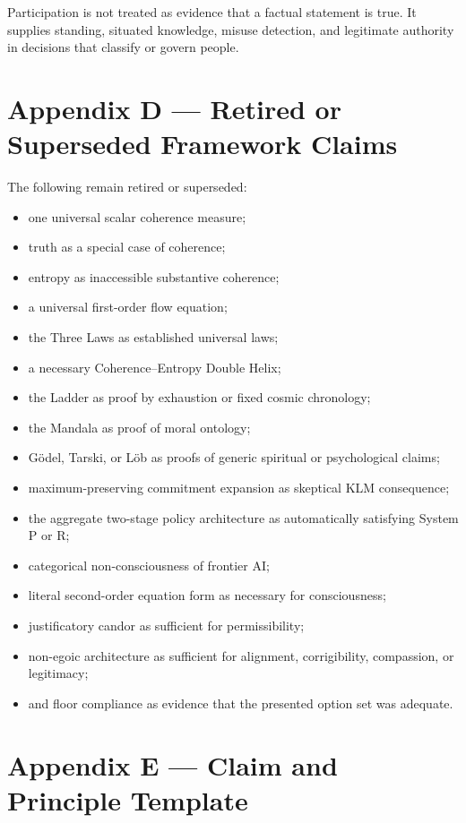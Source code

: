 \documentclass[
  11pt,
]{article}
\providecommand{\tightlist}{%
  \setlength{\itemsep}{0pt}\setlength{\parskip}{0pt}}
\begin{document}
Participation is not treated as evidence that a factual statement is
true. It supplies standing, situated knowledge, misuse detection, and
legitimate authority in decisions that classify or govern people.

\section{Appendix D --- Retired or Superseded Framework
Claims}\label{appendix-d-retired-or-superseded-framework-claims}

The following remain retired or superseded:

\begin{itemize}
\tightlist
\item
  one universal scalar coherence measure;
\item
  truth as a special case of coherence;
\item
  entropy as inaccessible substantive coherence;
\item
  a universal first-order flow equation;
\item
  the Three Laws as established universal laws;
\item
  a necessary Coherence--Entropy Double Helix;
\item
  the Ladder as proof by exhaustion or fixed cosmic chronology;
\item
  the Mandala as proof of moral ontology;
\item
  Gödel, Tarski, or Löb as proofs of generic spiritual or psychological
  claims;
\item
  maximum-preserving commitment expansion as skeptical KLM consequence;
\item
  the aggregate two-stage policy architecture as automatically
  satisfying System P or R;
\item
  categorical non-consciousness of frontier AI;
\item
  literal second-order equation form as necessary for consciousness;
\item
  justificatory candor as sufficient for permissibility;
\item
  non-egoic architecture as sufficient for alignment, corrigibility,
  compassion, or legitimacy;
\item
  and floor compliance as evidence that the presented option set was
  adequate.
\end{itemize}

\section{Appendix E --- Claim and Principle
Template}\label{appendix-e-claim-and-principle-template}
\end{document}
